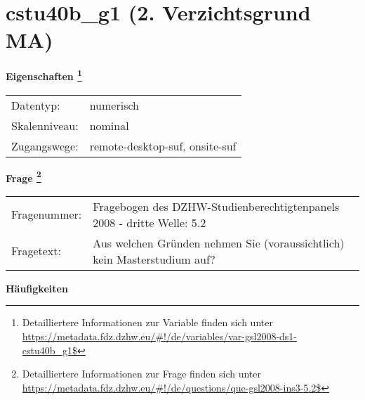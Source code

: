 
    \setcounter{footnote}{0}

    \vspace*{-1.8cm}
	\section{cstu40b\_g1 (2. Verzichtsgrund MA)}
	\label{section:cstu40b_g1}



    \vspace*{0.5cm}
    \noindent\textbf{Eigenschaften
	\footnote{Detailliertere Informationen zur Variable finden sich unter
		\url{https://metadata.fdz.dzhw.eu/\#!/de/variables/var-gsl2008-ds1-cstu40b_g1$}}}\\
	\begin{tabularx}{\hsize}{@{}lX}
	Datentyp: & numerisch \\
	Skalenniveau: & nominal \\
	Zugangswege: &
	  remote-desktop-suf, 
	  onsite-suf
 \\
    \end{tabularx}



				\vspace*{0.5cm}
                \noindent\textbf{Frage
	                \footnote{Detailliertere Informationen zur Frage finden sich unter
		              \url{https://metadata.fdz.dzhw.eu/\#!/de/questions/que-gsl2008-ins3-5.2$}}}\\
				\begin{tabularx}{\hsize}{@{}lX}
					Fragenummer: &
					  Fragebogen des DZHW-Studienberechtigtenpanels 2008 - dritte Welle:
					  5.2
 \\
					Fragetext: & Aus welchen Gründen nehmen Sie (voraussichtlich) kein Masterstudium auf? \\
				\end{tabularx}





        		\vspace*{0.5cm}
                \noindent\textbf{Häufigkeiten}


